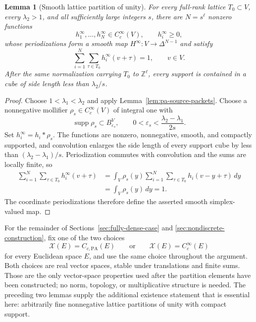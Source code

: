 \documentclass[11pt,reqno]{amsart}
\numberwithin{equation}{section}
\newtheorem{lemma}[theorem]{Lemma}
\theoremstyle{definition}
\theoremstyle{remark}
\newcommand{\Z}{\mathbb Z}
\newcommand{\supp}{\operatorname{supp}}
\begin{document}
\begin{lemma}[Smooth lattice partition of unity]
\label{lem:smooth-source-partition}
For every full-rank lattice $T_0\subset V$, every $\lambda_2>1$, and all
sufficiently large integers $s$, there are $N=s^\ell$ nonzero functions
\[
 h_1^\infty,\ldots,h_N^\infty\in C_c^\infty(V),
 \qquad h_i^\infty\ge0,
\]
whose periodizations form a smooth map
$H^\infty:V\to\Delta^{N-1}$ and satisfy
\begin{equation}\label{eq:smooth-source-partition}
 \sum_{i=1}^N\sum_{\tau\in T_0}h_i^\infty(v+\tau)=1,
 \qquad v\in V.
\end{equation}
After the same normalization carrying $T_0$ to $\Z^\ell$, every support is
contained in a cube of side length less than $\lambda_2/s$.
\end{lemma}

\begin{proof}
Choose $1<\lambda_1<\lambda_2$ and apply
Lemma~\ref{lem:pa-source-packets}.  Choose a nonnegative mollifier
$\rho_s\in C_c^\infty(V)$ of integral one with
\[
 \supp\rho_s\subset B_{\varepsilon_s}^V,
 \qquad
 0<\varepsilon_s<\frac{\lambda_2-\lambda_1}{2s}.
\]
Set $h_i^\infty=h_i*\rho_s$.  The functions are nonzero, nonnegative,
smooth, and compactly supported, and convolution enlarges the side length of
every support cube by less than $(\lambda_2-\lambda_1)/s$.  Periodization
commutes with convolution and the sums are locally finite, so
\begin{align*}
 \sum_{i=1}^N\sum_{\tau\in T_0}h_i^\infty(v+\tau)
 &=\int_V\rho_s(y)
   \sum_{i=1}^N\sum_{\tau\in T_0}h_i(v-y+\tau)\,dy\\
 &=\int_V\rho_s(y)\,dy=1.
\end{align*}
The coordinate periodizations therefore define the asserted smooth
simplex-valued map.
\end{proof}

For the remainder of Sections~\ref{sec:fully-dense-case} and
\ref{sec:nondiscrete-construction}, fix one of the two choices
\begin{equation}\label{eq:function-space-X}
 \mathcal X(E)=C_{c,\mathrm{PA}}(E)
 \qquad\text{or}\qquad
 \mathcal X(E)=C_c^\infty(E)
\end{equation}
for every Euclidean space $E$, and use the same choice throughout the
argument.  Both choices are real vector spaces, stable under translations
and finite sums.  Those are the only vector-space properties used after the
partition elements have been constructed; no norm, topology, or
multiplicative structure is needed.  The preceding two lemmas supply the
additional existence statement that is essential here: arbitrarily fine
nonnegative lattice partitions of unity with compact support.
\end{document}

